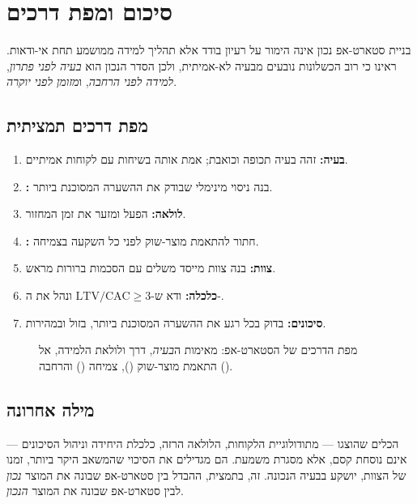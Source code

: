 \chapter{סיכום ומפת דרכים}

בניית סטארט-אפ נכון אינה הימור על רעיון בודד אלא תהליך למידה ממושמע תחת
אי-ודאות. ראינו כי רוב הכשלונות נובעים מבעיה לא-אמיתית, ולכן הסדר הנכון הוא
\emph{בעיה לפני פתרון}, \emph{למידה לפני הרחבה}, ו\emph{מזומן לפני יוקרה}.

\section{מפת דרכים תמציתית}

\begin{enumerate}
  \item \textbf{בעיה:} זהה בעיה תכופה וכואבת; אמת אותה בשיחות עם לקוחות אמיתיים.
  \item \textbf{:} בנה ניסוי מינימלי שבודק את ההשערה המסוכנת ביותר.
  \item \textbf{לולאה:} הפעל  ומזער את זמן המחזור.
  \item \textbf{:} חתור להתאמת מוצר-שוק לפני כל השקעה בצמיחה.
  \item \textbf{צוות:} בנה צוות מייסד משלים עם הסכמות ברורות מראש.
  \item \textbf{כלכלה:} ודא ש-$\mathrm{LTV}/\mathrm{CAC} \geq 3$ ונהל את ה-.
  \item \textbf{סיכונים:} בדוק בכל רגע את ההשערה המסוכנת ביותר, בזול ובמהירות.
\end{enumerate}

\begin{figure}[htbp]
\centering
{}
\caption{מפת הדרכים של הסטארט-אפ: מאימות ה\emph{בעיה}, דרך  ולולאת הלמידה,
אל התאמת מוצר-שוק (), צמיחה () והרחבה ().}
\label{fig:roadmap}
\end{figure}

\section{מילה אחרונה}

הכלים שהוצגו — מתודולוגיית הלקוחות, הלולאה הרזה, כלכלת היחידה וניהול הסיכונים —
אינם נוסחת קסם, אלא מסגרת משמעת. הם מגדילים את הסיכוי שהמשאב היקר ביותר, זמנו
של הצוות, יושקע בבעיה הנכונה. זה, בתמצית, ההבדל בין סטארט-אפ שבונה את המוצר
\emph{נכון} לבין סטארט-אפ שבונה את המוצר \emph{הנכון}.
